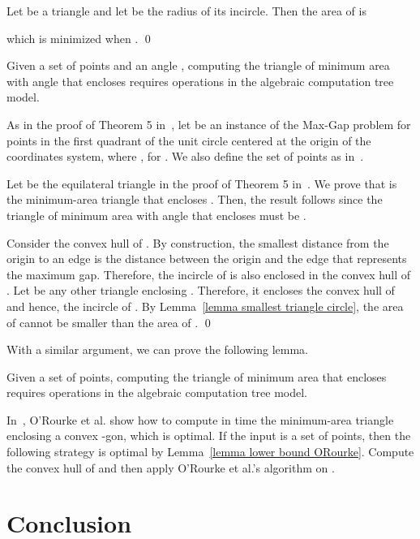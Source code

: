 \documentclass[11pt, oneside]{article}
\begin{document}
\proof Let  be a triangle
and let  be the radius of its incircle.
Then the area of  is

which is minimized when .
\qed

\begin{proposition}
Given a set  of  points and an angle ,
computing the triangle of minimum area with angle  
that encloses 
requires  operations in the algebraic computation tree model.
\end{proposition}

\proof
As in the proof of Theorem 5 in~\cite{DBLP:journals/ijcga/BoseMSS11},
let  be an instance of the Max-Gap
problem for points in the first quadrant of the unit circle centered at the origin of
the coordinates system,
where ,
for .
We also define the set of points 
as in~\cite{DBLP:journals/ijcga/BoseMSS11}.

Let  be the equilateral triangle in the proof of Theorem 5 in~\cite{DBLP:journals/ijcga/BoseMSS11}.
We prove that 
is the minimum-area triangle that encloses .
Then,
the result follows since
the triangle of minimum area with angle 
that encloses  must be .

Consider the convex hull of .
By construction,
the smallest distance from the origin to an edge is
the distance between the origin and the edge that represents the maximum gap.
Therefore,
the incircle of  is also enclosed in the convex hull of .
Let  be any other triangle enclosing .
Therefore,
it encloses the convex hull of  and hence,
the incircle of .
By Lemma~\ref{lemma smallest triangle circle},
the area of  cannot be smaller than the area of .
\qed

With a similar argument,
we can prove the following lemma.
\begin{lemma}
\label{lemma lower bound ORourke}
Given a set  of  points,
computing the triangle of minimum area that encloses 
requires  operations in the algebraic computation tree model.
\end{lemma}

In~\cite{DBLP:journals/jal/ORourkeAMB86},
O'Rourke et al. show how to compute in  time
the minimum-area triangle enclosing a convex -gon,
which is optimal.
If the input is a set  of  points,
then the following strategy is optimal
by Lemma~\ref{lemma lower bound ORourke}.
Compute the convex hull  of 
and then apply O'Rourke et al.'s algorithm on .



\section{Conclusion}
\label{section conclusion}
\end{document}
